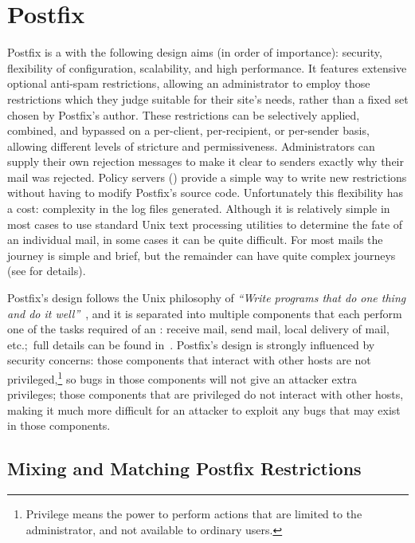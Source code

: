 \section{Postfix}

\label{postfix background}

Postfix is a  with the following design aims (in order of
importance): security, flexibility of configuration, scalability, and high
performance.  It features extensive optional anti-spam restrictions,
allowing an administrator to employ those restrictions which they judge
suitable for their site's needs, rather than a fixed set chosen by
Postfix's author.  These restrictions can be selectively applied, combined,
and bypassed on a per-client, per-recipient, or per-sender basis, allowing
different levels of stricture and permissiveness.  Administrators can
supply their own rejection messages to make it clear to senders exactly why
their mail was rejected.  Policy servers ()
provide a simple way to write new restrictions without having to modify
Postfix's source code.  Unfortunately this flexibility has a cost:
complexity in the log files generated.  Although it is relatively simple in
most cases to use standard Unix text processing utilities to determine the
fate of an individual mail, in some cases it can be quite difficult.  For
most mails the journey is simple and brief, but the remainder can have
quite complex journeys (see  for details).

Postfix's design follows the Unix philosophy of \textit{``Write programs
that do one thing and do it well''\/}~\cite{unix-philosophy}, and it is
separated into multiple components that each perform one of the tasks
required of an \@: receive mail, send mail, local delivery of
mail, etc.;\ full details can be found in~\cite{postfix-overview}.
Postfix's design is strongly influenced by security concerns: those
components that interact with other hosts are not
privileged,\footnote{Privilege means the power to perform actions that are
limited to the administrator, and not available to ordinary users.} so bugs
in those components will not give an attacker extra privileges; those
components that are privileged do not interact with other hosts, making it
much more difficult for an attacker to exploit any bugs that may exist in
those components.

\subsection{Mixing and Matching Postfix Restrictions}

